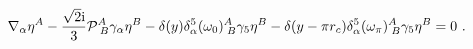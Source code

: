 \begin{equation} 
	\nabla_\alpha\eta^A-\frac{\sqrt{2}{\rm i}}{3}{\cal P}^{A}_{\;B}\gamma_\alpha\eta^B-\delta(y)\delta_\alpha^5(\omega_{0})^{A}_{\;B}\gamma_5\eta^B-\delta(y-\pi r_c)\delta_\alpha^5(\omega_\pi)^{A}_{\;B}\gamma_5\eta^B=0\ .	 
       \end{equation} 
